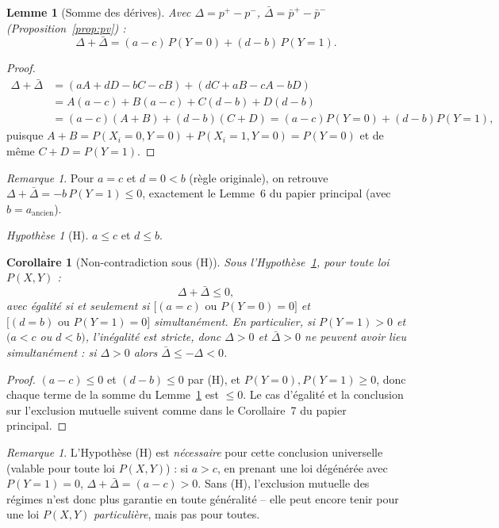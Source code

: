 \documentclass[12pt,a4paper]{article}
\newtheorem{lemma}[theorem]{Lemme}
\newtheorem{corollary}[theorem]{Corollaire}
\theoremstyle{remark}
\newtheorem{remark}[theorem]{Remarque}
\newtheorem{hypothese}[theorem]{Hypothèse}
\begin{document}
\begin{lemma}[Somme des dérives]\label{lem:sum-gen}
Avec $\Delta=p^+-p^-$, $\bar\Delta=\bar p^+-\bar p^-$ (Proposition~\ref{prop:pv}) :
\[
  \Delta+\bar\Delta = (a-c)\,P(Y{=}0) + (d-b)\,P(Y{=}1).
\]
\end{lemma}

\begin{proof}
\begin{align*}
\Delta+\bar\Delta &= (aA+dD-bC-cB) + (dC+aB-cA-bD) \\
&= A(a-c) + B(a-c) + C(d-b) + D(d-b) \\
&= (a-c)(A+B) + (d-b)(C+D)
= (a-c)P(Y{=}0)+(d-b)P(Y{=}1),
\end{align*}
puisque $A+B=P(X_i{=}0,Y{=}0)+P(X_i{=}1,Y{=}0)=P(Y{=}0)$ et de même $C+D=P(Y{=}1)$.
\end{proof}

\begin{remark}
Pour $a=c$ et $d=0<b$ (règle originale), on retrouve
$\Delta+\bar\Delta=-b\,P(Y{=}1)\le0$, exactement le Lemme~6 du papier
principal (avec $b=a_{\mathrm{ancien}}$).
\end{remark}

\begin{hypothese}[H]\label{hyp:H}
$a\le c$ et $d\le b$.
\end{hypothese}

\begin{corollary}[Non-contradiction sous (H)]\label{cor:excl-gen}
Sous l'Hypothèse~\ref{hyp:H}, pour toute loi $P(X,Y)$ :
\[
  \Delta+\bar\Delta\le0,
\]
avec égalité si et seulement si $\bigl[(a{=}c)\text{ ou }P(Y{=}0){=}0\bigr]$ et
$\bigl[(d{=}b)\text{ ou }P(Y{=}1){=}0\bigr]$ simultanément. En particulier,
si $P(Y{=}1)>0$ et $(a<c$ ou $d<b)$, l'inégalité est stricte, donc
$\Delta>0$ et $\bar\Delta>0$ ne peuvent avoir lieu simultanément : si
$\Delta>0$ alors $\bar\Delta\le-\Delta<0$.
\end{corollary}

\begin{proof}
$(a-c)\le0$ et $(d-b)\le0$ par (H), et $P(Y{=}0),P(Y{=}1)\ge0$, donc chaque
terme de la somme du Lemme~\ref{lem:sum-gen} est $\le0$. Le cas d'égalité et
la conclusion sur l'exclusion mutuelle suivent comme dans le Corollaire~7 du
papier principal.
\end{proof}

\begin{remark}
L'Hypothèse (H) est \emph{nécessaire} pour cette conclusion universelle
(valable pour toute loi $P(X,Y)$) : si $a>c$, en prenant une loi dégénérée
avec $P(Y{=}1)=0$, $\Delta+\bar\Delta=(a-c)>0$. Sans (H), l'exclusion mutuelle
des régimes n'est donc plus garantie en toute généralité -- elle peut encore
tenir pour une loi $P(X,Y)$ \emph{particulière}, mais pas pour toutes.
\end{remark}
\end{document}
